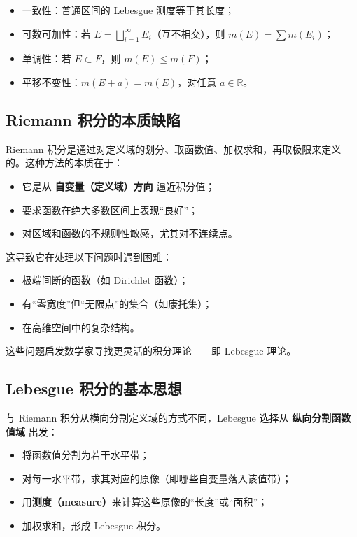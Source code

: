 \documentclass[a4paper, oneside]{article}
\begin{document}
\begin{itemize}
    \item 一致性：普通区间的 Lebesgue 测度等于其长度；
    \item 可数可加性：若 $E = \bigsqcup_{i=1}^{\infty} E_i$（互不相交），则 $m(E) = \sum m(E_i)$；
    \item 单调性：若 $E \subset F$，则 $m(E) \leq m(F)$；
    \item 平移不变性：$m(E + a) = m(E)$，对任意 $a \in \mathbb{R}$。
\end{itemize}

\subsection{Riemann 积分的本质缺陷}

Riemann 积分是通过对定义域的划分、取函数值、加权求和，再取极限来定义的。这种方法的本质在于：

\begin{itemize}
    \item 它是从 \textbf{自变量（定义域）方向} 逼近积分值；
    \item 要求函数在绝大多数区间上表现“良好”；
    \item 对区域和函数的不规则性敏感，尤其对不连续点。
\end{itemize}

这导致它在处理以下问题时遇到困难：

\begin{itemize}
    \item 极端间断的函数（如 Dirichlet 函数）；
    \item 有“零宽度”但“无限点”的集合（如康托集）；
    \item 在高维空间中的复杂结构。
\end{itemize}

这些问题启发数学家寻找更灵活的积分理论——即 Lebesgue 理论。

\subsection{Lebesgue 积分的基本思想}

与 Riemann 积分从横向分割定义域的方式不同，Lebesgue 选择从 \textbf{纵向分割函数值域} 出发：

\begin{itemize}
    \item 将函数值分割为若干水平带；
    \item 对每一水平带，求其对应的原像（即哪些自变量落入该值带）；
    \item 用\textbf{测度（measure）}来计算这些原像的“长度”或“面积”；
    \item 加权求和，形成 Lebesgue 积分。
\end{itemize}
\end{document}
